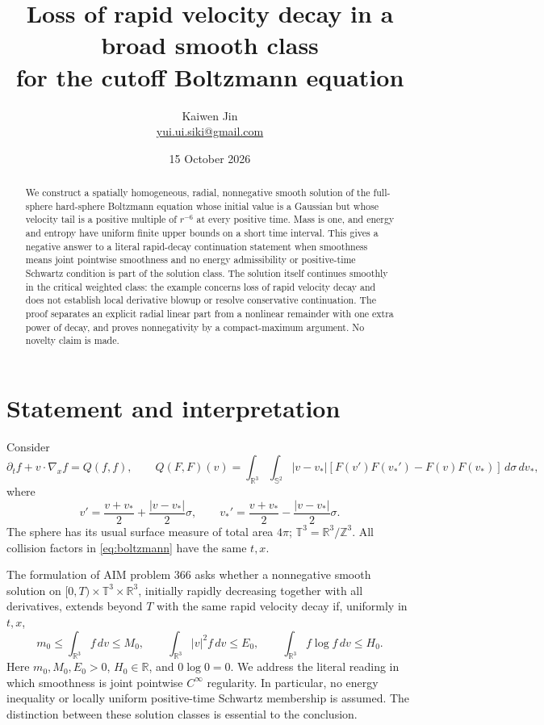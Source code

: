 \documentclass[11pt,a4paper]{article}
\title{Loss of rapid velocity decay in a broad smooth class\\
for the cutoff Boltzmann equation}
\author{Kaiwen Jin\\
\small\href{mailto:yui.ui.siki@gmail.com}{yui.ui.siki@gmail.com}}
\date{15 October 2026}
\numberwithin{equation}{section}
\theoremstyle{remark}
\newcommand{\R}{\mathbb R}
\newcommand{\T}{\mathbb T}
\newcommand{\Sph}{\mathbb S}
\newcommand{\dd}{\,d}
\begin{document}
\maketitle
\begin{abstract}
We construct a spatially homogeneous, radial, nonnegative smooth solution of
the full-sphere hard-sphere Boltzmann equation whose initial value is a
Gaussian but whose velocity tail is a positive multiple of \(r^{-6}\) at
every positive time. Mass is one, and energy and entropy have uniform finite
upper bounds on a short time interval. This gives a negative answer to a
literal rapid-decay continuation statement when smoothness means joint
pointwise smoothness and no energy admissibility or positive-time Schwartz
condition is part of the solution class. The solution itself continues
smoothly in the critical weighted class: the example concerns loss of rapid
velocity decay and does not establish local derivative blowup or resolve
conservative continuation. The proof separates an explicit radial linear
part from a nonlinear remainder with one extra power of decay, and proves
nonnegativity by a compact-maximum argument. No novelty claim is made.
\end{abstract}

\section{Statement and interpretation}\label{sec:statement}

Consider
\begin{equation}\label{eq:boltzmann}
 \partial_t f+v\cdot\nabla_xf=Q(f,f),\qquad
 Q(F,F)(v)=\int_{\R^3}\int_{\Sph^2}|v-v_*|
 [F(v')F(v_*')-F(v)F(v_*)]\dd\sigma\dd v_*,
\end{equation}
where
\[
 v'=\frac{v+v_*}{2}+\frac{|v-v_*|}{2}\sigma,\qquad
 v_*'=\frac{v+v_*}{2}-\frac{|v-v_*|}{2}\sigma.
\]
The sphere has its usual surface measure of total area \(4\pi\);
\(\T^3=\R^3/\mathbb Z^3\). All collision factors in
\eqref{eq:boltzmann} have the same \(t,x\).

The formulation of AIM problem 366 asks whether a nonnegative smooth
solution on \([0,T)\times\T^3\times\R^3\), initially rapidly decreasing
together with all derivatives, extends beyond \(T\) with the same rapid
velocity decay if, uniformly in \(t,x\),
\begin{equation}\label{eq:macroscopic}
 m_0\leq\int_{\R^3}f\dd v\leq M_0,\qquad
 \int_{\R^3}|v|^2f\dd v\leq E_0,\qquad
 \int_{\R^3}f\log f\dd v\leq H_0.
\end{equation}
Here \(m_0,M_0,E_0>0\), \(H_0\in\R\), and \(0\log0=0\).
We address the literal reading in which smoothness is joint pointwise
\(C^\infty\) regularity. In particular, no energy inequality or locally
uniform positive-time Schwartz membership is assumed. The distinction
between these solution classes is essential to the conclusion.
\end{document}

